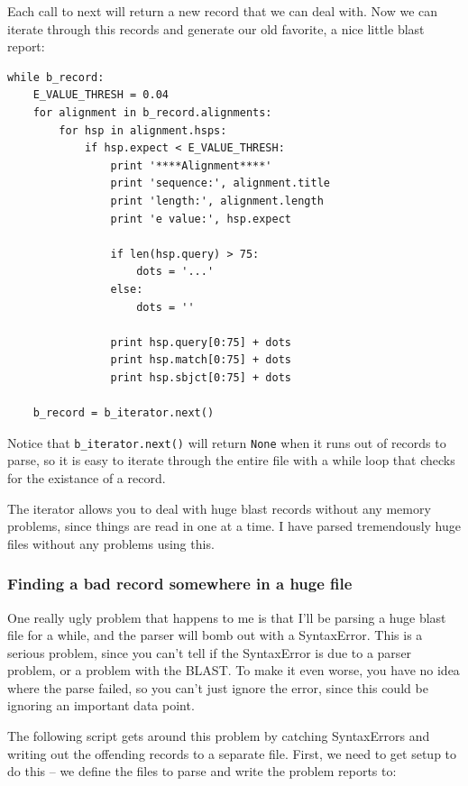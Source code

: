 \documentclass{article}
\begin{document}
Each call to next will return a new record that we can deal with. Now we can iterate through this records and generate our old favorite, a nice little blast report:

\begin{verbatim}
while b_record:
    E_VALUE_THRESH = 0.04
    for alignment in b_record.alignments:
        for hsp in alignment.hsps:
            if hsp.expect < E_VALUE_THRESH:
                print '****Alignment****'
                print 'sequence:', alignment.title
                print 'length:', alignment.length
                print 'e value:', hsp.expect

                if len(hsp.query) > 75:
                    dots = '...'
                else:
                    dots = ''
                
                print hsp.query[0:75] + dots
                print hsp.match[0:75] + dots
                print hsp.sbjct[0:75] + dots

    b_record = b_iterator.next()
\end{verbatim}

Notice that \verb|b_iterator.next()| will return \verb|None| when it runs out of records to parse, so it is easy to iterate through the entire file with a while loop that checks for the existance of a record.


The iterator allows you to deal with huge blast records without any memory problems, since things are read in one at a time. I have parsed tremendously huge files without any problems using this.

\subsubsection{Finding a bad record somewhere in a huge file}

One really ugly problem that happens to me is that I'll be parsing a huge blast file for a while, and the parser will bomb out with a SyntaxError. This is a serious problem, since you can't tell if the SyntaxError is due to a parser problem, or a problem with the BLAST. To make it even worse, you have no idea where the parse failed, so you can't just ignore the error, since this could be ignoring an important data point.


The following script gets around this problem by catching SyntaxErrors and writing out the offending records to a separate file. First, we need to get setup to do this -- we define the files to parse and write the problem reports to:
\end{document}
